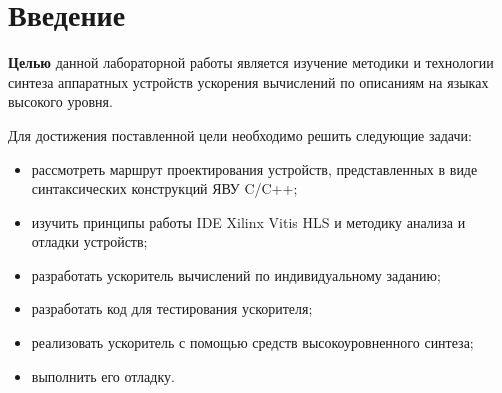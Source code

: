 \chapter*{Введение}

\textbf{Целью} данной лабораторной работы является изучение методики и технологии синтеза аппаратных устройств ускорения
вычислений по описаниям на языках высокого уровня.

Для достижения поставленной цели необходимо решить следующие задачи:
\begin{itemize}
	\item рассмотреть маршрут проектирования устройств, представленных в виде синтаксических конструкций ЯВУ C/C++;
	\item изучить принципы работы IDE Xilinx Vitis HLS и методику анализа и отладки устройств;
	\item разработать ускоритель вычислений по индивидуальному заданию;
	\item разработать код для тестирования ускорителя;
	\item реализовать ускоритель с помощью средств высокоуровненного синтеза;
	\item выполнить его отладку.
\end{itemize}